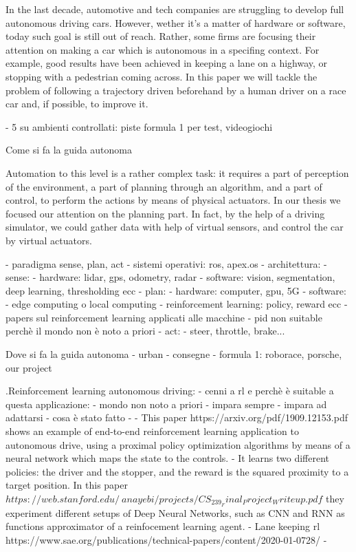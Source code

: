In the last decade, automotive and tech companies are struggling to develop full autonomous driving cars. However, wether it's a matter of hardware or software, today such goal is still out of reach. Rather, some firms are focusing their attention on making a car which is autonomous in a specifing context. For example, good results have been achieved in keeping a lane on a highway, or stopping with a pedestrian coming across. 
In this paper we will tackle the problem of following a trajectory driven beforehand by a human driver on a race car and, if possible, to improve it.




	- 5 su ambienti controllati: piste formula 1 per test, videogiochi
	
	
Come si fa la guida autonoma

Automation to this level is a rather complex task: it requires a part of perception of the environment, a part of planning through an algorithm, and a part of control, to perform the actions by means of physical actuators.
In our thesis we focused our attention on the planning part. In fact, by the help of a driving simulator, we could gather data with help of virtual sensors, and control the car by virtual actuators.



	- paradigma sense, plan, act
	- sistemi operativi: ros, apex.os
	- architettura: 
		- sense: 
			- hardware: lidar, gps, odometry, radar
			- software: vision, segmentation, deep learning, thresholding ecc
		- plan:
			- hardware: computer, gpu, 5G
			- software: 
				- edge computing o local computing
				- reinforcement learning: policy, reward ecc
					- papers sul reinforcement learning applicati alle macchine
				- pid non suitable perchè il mondo non è noto a priori
		- act:
			- steer, throttle, brake...

Dove si fa la guida autonoma
	- urban
	- consegne
	- formula 1: roborace, porsche, our project



.Reinforcement learning autonomous driving:
	- cenni a rl e perchè è suitable a questa applicazione:
			- mondo non noto a priori
			- impara sempre
			- impara ad adattarsi
	- cosa è stato fatto
		- 
- This paper https://arxiv.org/pdf/1909.12153.pdf shows an example of end-to-end reinforcement learning application to autonomous drive, using a proximal policy optimization algorithms by means of a neural network which maps the state to the controls. - It learns two different policies: the driver and the stopper, and the reward is the squared proximity to a target position.
In this paper $https://web.stanford.edu/~anayebi/projects/CS_239_Final_Project_Writeup.pdf$ they experiment different setups of Deep Neural Networks, such as CNN and RNN as functions approximator of a reinfocement learning agent.
- Lane keeping rl https://www.sae.org/publications/technical-papers/content/2020-01-0728/
- 


